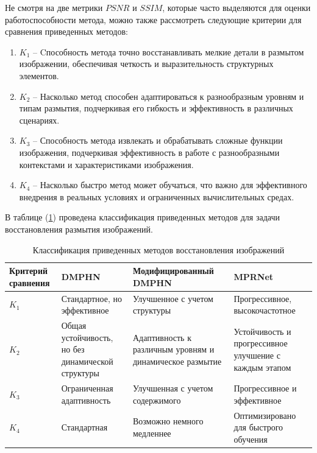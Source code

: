 Не смотря на две метрики \(PSNR\) и \(SSIM\), которые часто выделяются для оценки работоспособности метода, можно также рассмотреть следующие критерии для сравнения приведенных методов:
\begin{enumerate}
	\item \(K_{1}\) -- Cпособность метода точно восстанавливать мелкие детали в размытом изображении, обеспечивая четкость и выразительность структурных элементов.
	\item \(K_{2}\) -- Насколько метод способен адаптироваться к разнообразным уровням и типам размытия, подчеркивая его гибкость и эффективность в различных сценариях.
	\item \(K_{3}\) -- Способность метода извлекать и обрабатывать сложные функции изображения, подчеркивая эффективность в работе с разнообразными контекстами и характеристиками изображения.
	\item \(K_{4}\) -- Насколько быстро метод может обучаться, что важно для эффективного внедрения в реальных условиях и ограниченных вычислительных средах.
\end{enumerate}

В таблице (\ref{tab:comparison}) проведена классификация приведенных методов для задачи восстановления размытия изображений.

\begin{table}[H]
    \centering
    \caption{Классификация приведенных методов восстановления изображений}
    \label{tab:comparison}
    \begin{tabular}{|p{3cm}|p{3.8cm}|p{4.6cm}|p{3.8cm}|}
        \hline
        \textbf{Критерий сравнения} & \textbf{DMPHN} & \textbf{Модифицированный DMPHN} & \textbf{MPRNet} \\ \hline
        \(K_{1}\) & Стандартное, но эффективное & Улучшенное с учетом структуры & Прогрессивное, высокочастотное \\ \hline
        \(K_{2}\) & Общая устойчивость, но без динамической структуры & Адаптивность к различным уровням и динамическое размытие & Устойчивость и прогрессивное улучшение с каждым этапом \\ \hline
        \(K_{3}\) & Ограниченная адаптивность & Улучшенная с учетом содержимого & Прогрессивное и эффективное \\ \hline
        \(K_{4}\) & Стандартная & Возможно немного медленнее & Оптимизировано для быстрого обучения \\ \hline
    \end{tabular}
\end{table}

